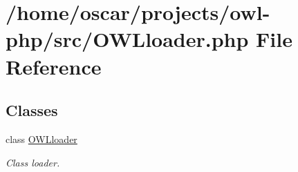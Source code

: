 \section{/home/oscar/projects/owl-\/php/src/OWLloader.php File Reference}
\label{OWLloader_8php}
\subsection*{Classes}
\begin{DoxyCompactItemize}
\item 
class \hyperlink{classOWLloader}{OWLloader}
\begin{DoxyCompactList}\small\item\em Class loader. \item\end{DoxyCompactList}\end{DoxyCompactItemize}

